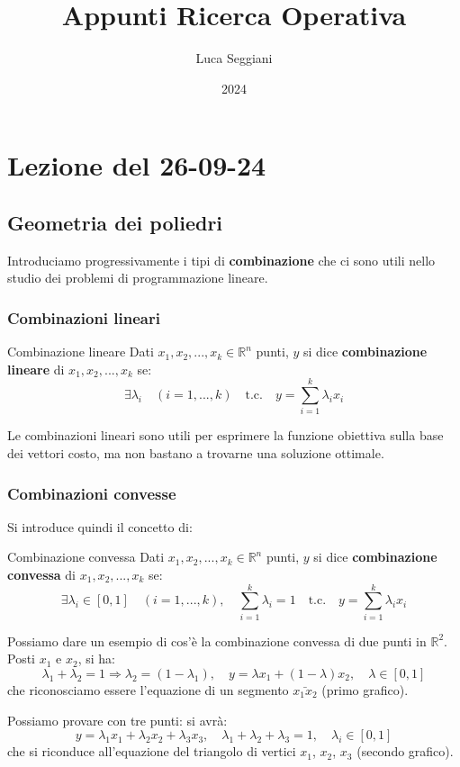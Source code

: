 \documentclass[a4paper,11pt]{article}
\title{Appunti Ricerca Operativa}
\author{Luca Seggiani}
\date{2024}
\begin{document}
\section{Lezione del 26-09-24}

\thispagestyle{empty}
\pagestyle{fancy}

\subsection{Geometria dei poliedri}
Introduciamo progressivamente i tipi di \textbf{combinazione} che ci sono utili nello studio dei problemi di programmazione lineare.

\subsubsection{Combinazioni lineari}
\begin{definition}{Combinazione lineare}
	Dati $ x_1, x_2, ..., x_k \in \mathbb{R}^n $ punti, $y$ si dice \textbf{combinazione lineare} di $ x_1, x_2, ..., x_k $ se:
	$$
	\exists \lambda_i \quad (i = 1, ..., k) \quad \text{t.c.} \quad y = \sum_{i=1}^k \lambda_i x_i 
	$$
\end{definition}

Le combinazioni lineari sono utili per esprimere la funzione obiettiva sulla base dei vettori costo, ma non bastano a trovarne una soluzione ottimale.

\subsubsection{Combinazioni convesse}
Si introduce quindi il concetto di:
\begin{definition}{Combinazione convessa}
	Dati $ x_1, x_2, ..., x_k \in \mathbb{R}^n $ punti, $y$ si dice \textbf{combinazione convessa} di $ x_1, x_2, ..., x_k $ se:
	$$
	\exists \lambda_i \in [0, 1] \quad (i = 1, ..., k), \quad \sum_{i=1}^k \lambda_i = 1 \quad \text{t.c.} \quad y = \sum_{i=1}^k \lambda_i x_i 
	$$
\end{definition}

Possiamo dare un esempio di cos'è la combinazione convessa di due punti in $\mathbb{R}^2$.
Posti $x_1$ e $x_2$, si ha:
$$
\lambda_1 + \lambda_2 = 1 \Rightarrow \lambda_2 = (1 - \lambda_1), \quad y = \lambda x_1 + (1 - \lambda ) x_2, \quad \lambda \in [0, 1]
$$
che riconosciamo essere l'equazione di un segmento $\bar{x_1x_2}$ (primo grafico).

Possiamo provare con tre punti: si avrà:
$$
y = \lambda_1 x_1 + \lambda_2 x_2 + \lambda_3 x_3, \quad \lambda_1 + \lambda_2 + \lambda_3 = 1, \quad \lambda_i \in [0, 1]
$$
che si riconduce all'equazione del triangolo di vertici $x_1$, $x_2$, $x_3$ (secondo grafico).
\par\medskip
\end{document}
